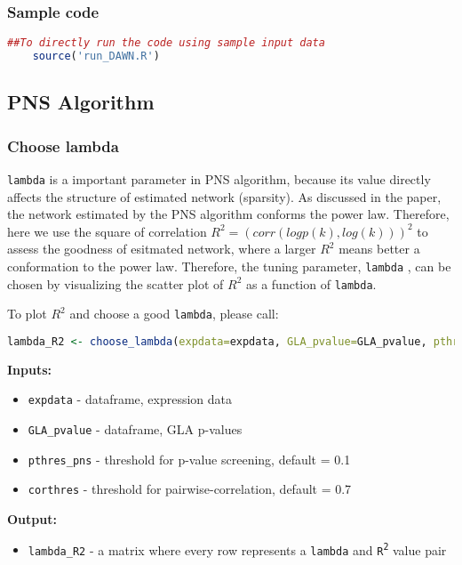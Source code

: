 \documentclass{article}
\begin{document}
	\subsubsection{Sample code}	
	\begin{lstlisting}[language=R]
	##To directly run the code using sample input data
	source('run_DAWN.R')
	\end{lstlisting}

	\subsection{PNS Algorithm}
	\subsubsection{Choose lambda}
	\label{chooseLambda}
	\texttt{lambda} is a important parameter in PNS algorithm, because its value directly affects the structure of estimated network (sparsity). As discussed in the paper, the network estimated by the PNS algorithm conforms the power law. Therefore, here we use the square of correlation $R^2 = (corr(log p(k), log(k)))^2$ to assess the goodness of esitmated network, where a larger $R^2$ means better a conformation to the power law. Therefore, the tuning parameter, \texttt{lambda} , can be chosen by visualizing the scatter plot of $R^2$ as a function of \texttt{lambda}.
	
	To plot $R^2$ and choose a good \texttt{lambda}, please call:
	\begin{lstlisting}[language=R]
		lambda_R2 <- choose_lambda(expdata=expdata, GLA_pvalue=GLA_pvalue, pthres_pns=pthres_pns, corthres=corthres)
	\end{lstlisting}
	\textbf{Inputs:}
	\begin{itemize}
		\item \texttt{expdata} - dataframe, expression data
		\item \texttt{GLA\_pvalue} - dataframe, GLA p-values
		\item \texttt{pthres\_pns} - threshold for p-value screening, default = 0.1
		\item \texttt{corthres} - threshold for pairwise-correlation, default = 0.7
	\end{itemize}
	\textbf{Output:}
	\begin{itemize}
		\item \texttt{lambda\_R2} - a matrix where every row represents a \texttt{lambda} and \texttt{R\textsuperscript{2}} value pair		
	\end{itemize}
	
\end{document}
